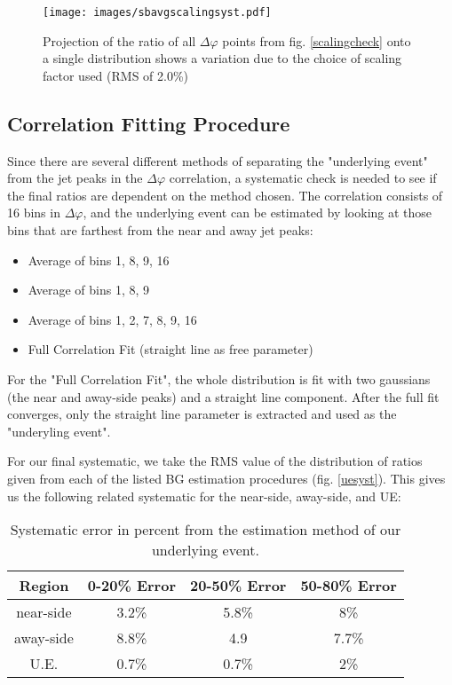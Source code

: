 \documentclass[ALICE,manyauthors]{ALICE_analysis_notes}
\begin{document}
\begin{figure}[ht]
\centering
\texttt{[image: images/sbavgscalingsyst.pdf]}
\caption{Projection of the ratio of all $\Delta\varphi$ points from fig. \ref{scalingcheck} onto a single distribution shows a variation due to the choice of scaling factor used (RMS of 2.0\%)}
\label{scalingRMS}
\end{figure}

\subsection{Correlation Fitting Procedure}
\label{corrfitproc}
Since there are several different methods of separating the "underlying event" from the jet peaks in the $\Delta\varphi$ correlation, a systematic check is needed to see if the final ratios are dependent on the method chosen.  The correlation consists of 16 bins in $\Delta\varphi$, and the underlying event can be estimated by looking at those bins that are farthest from the near and away jet peaks:

\begin{center}
\begin{itemize}
    \item Average of bins 1, 8, 9, 16
    \item Average of bins 1, 8, 9
    \item Average of bins 1, 2, 7, 8, 9, 16
    \item Full Correlation Fit (straight line as free parameter)
\end{itemize}
\end{center}

For the "Full Correlation Fit", the whole distribution is fit with two gaussians (the near and away-side peaks) and a straight line component.  After the full fit converges, only the straight line parameter is extracted and used as the "underyling event".

For our final systematic, we take the RMS value of the distribution of ratios given from each of the listed BG estimation procedures (fig. \ref{uesyst}). This gives us the following related systematic for the near-side, away-side, and UE:

\begin{table}[h!]
    \centering
\begin{tabular}{| c | c | c | c |}
\hline
Region & 0-20\% Error & 20-50\% Error & 50-80\% Error \\
\hline
near-side & 3.2\% & 5.8\% & 8\% \\
away-side & 8.8\% & 4.9 & 7.7\% \\
U.E. & 0.7\% & 0.7\% & 2\% \\
\hline
\end{tabular}
\caption{Systematic error in percent from the estimation method of our underlying event.}
\label{evttab}
\end{table}
\end{document}
